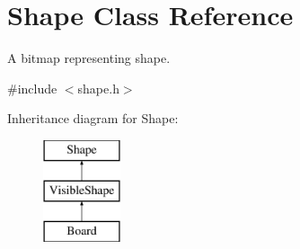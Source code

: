 \hypertarget{class_shape}{}\section{Shape Class Reference}
\label{class_shape}


A bitmap representing shape.  




{\ttfamily \#include $<$shape.\+h$>$}

Inheritance diagram for Shape\+:\begin{figure}[H]
\begin{center}
\leavevmode
\includegraphics[height=3.000000cm]{class_shape}
\end{center}
\end{figure}

